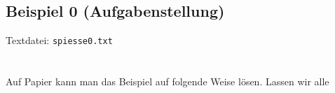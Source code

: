 \subsection{Beispiel 0 (Aufgabenstellung)}\label{example:0}
Textdatei: \texttt{spiesse0.txt}\\
\noindent
{}\\

\noindent
{}\\

Auf Papier kann man das Beispiel auf folgende Weise lösen.
Lassen wir alle 

\begin{figure}[H]
\centering
\begin{adjustbox}{minipage=\linewidth,scale=0.85}
\begin{subfigure}[t]{.24\textwidth}
\centering

\end{subfigure}\hfill
\begin{subfigure}[t]{.24\textwidth}
\centering

\end{subfigure}
\begin{subfigure}[t]{.24\textwidth}
\centering

\end{subfigure}\hfill
\begin{subfigure}[t]{.24\textwidth}
\centering

\end{subfigure}
\end{adjustbox}

\end{figure}


